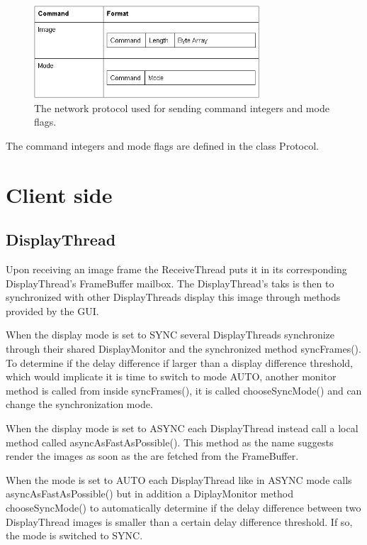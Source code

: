 \documentclass[8pt,titlepage]{article}
\begin{document}
%

\begin{figure}[hbp]
\centering
\includegraphics[width=0.75\textwidth]{../screenshots/tabell.png}
\caption{The network protocol used for sending command integers and mode flags.}
\end{figure}


\noindent The command integers and mode flags are defined in the class Protocol.

\clearpage
\section{Client side}

\subsection{DisplayThread}
Upon receiving an image frame the ReceiveThread puts it in its corresponding DisplayThread’s FrameBuffer mailbox. The DisplayThread’s taks is then to synchronized with other DisplayThreads display this image through methods provided by the GUI.

When the display mode is set to SYNC several DisplayThreads synchronize through their shared DisplayMonitor and the synchronized method syncFrames(). To determine if the delay difference if larger than a display difference threshold, which would implicate it is time to switch to mode AUTO, another monitor method is called from inside syncFrames(), it is called chooseSyncMode() and can change the synchronization mode.

When the display mode is set to ASYNC each DisplayThread instead call a local method called
asyncAsFastAsPossible(). This method as the name suggests render the images as soon as the are fetched from the FrameBuffer.

When the mode is set to AUTO each DisplayThread like in ASYNC mode calls asyncAsFastAsPossible() but in addition a DiplayMonitor method chooseSyncMode() to automatically determine if the delay difference between two DisplayThread images is smaller than a certain delay difference threshold. If so, the mode is switched to SYNC.
\end{document}
